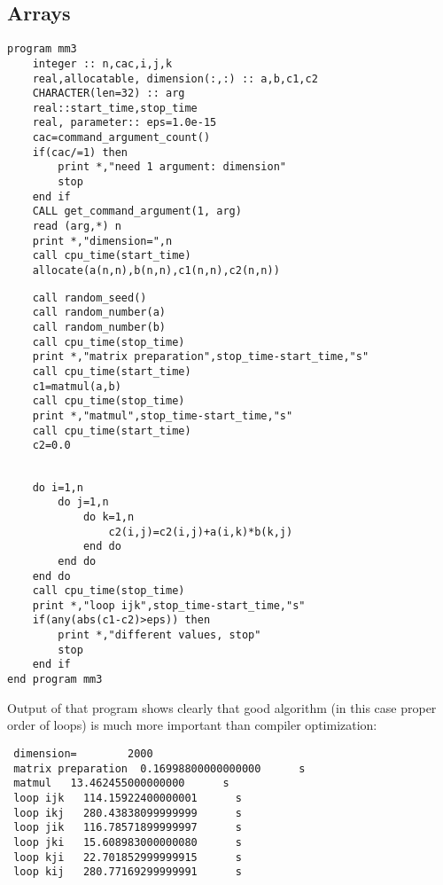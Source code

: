 \documentclass{beamer}
\begin{document}
\subsection{Arrays}
\begin{frame}[fragile]
\begin{verbatim}
program mm3
    integer :: n,cac,i,j,k
    real,allocatable, dimension(:,:) :: a,b,c1,c2
    CHARACTER(len=32) :: arg
    real::start_time,stop_time
    real, parameter:: eps=1.0e-15
    cac=command_argument_count()
    if(cac/=1) then
        print *,"need 1 argument: dimension"
        stop
    end if    
    CALL get_command_argument(1, arg)
    read (arg,*) n
    print *,"dimension=",n
    call cpu_time(start_time)
    allocate(a(n,n),b(n,n),c1(n,n),c2(n,n))
\end{verbatim}
\end{frame}
\begin{frame}[fragile]
\begin{verbatim}
    call random_seed()
    call random_number(a)
    call random_number(b)  
    call cpu_time(stop_time)
    print *,"matrix preparation",stop_time-start_time,"s"
    call cpu_time(start_time)
    c1=matmul(a,b)
    call cpu_time(stop_time)
    print *,"matmul",stop_time-start_time,"s"
    call cpu_time(start_time)
    c2=0.0
\end{verbatim}
\end{frame}
\begin{frame}[fragile]
\begin{verbatim}

    do i=1,n
        do j=1,n
            do k=1,n
                c2(i,j)=c2(i,j)+a(i,k)*b(k,j)
            end do
        end do
    end do
    call cpu_time(stop_time)
    print *,"loop ijk",stop_time-start_time,"s"
    if(any(abs(c1-c2)>eps)) then
        print *,"different values, stop"
        stop
    end if
end program mm3
\end{verbatim}
\end{frame}
\begin{frame}[fragile]
Output of that program shows clearly that good algorithm (in this case proper order of loops)
is much more important than compiler optimization:
\begin{verbatim}
 dimension=        2000
 matrix preparation  0.16998800000000000      s
 matmul   13.462455000000000      s
 loop ijk   114.15922400000001      s
 loop ikj   280.43838099999999      s
 loop jik   116.78571899999997      s
 loop jki   15.608983000000080      s
 loop kji   22.701852999999915      s
 loop kij   280.77169299999991      s
\end{verbatim}
\end{frame}
\end{document}
